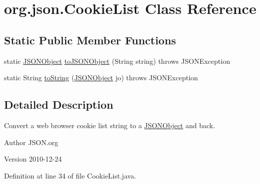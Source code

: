 \hypertarget{classorg_1_1json_1_1_cookie_list}{\section{org.\-json.\-Cookie\-List Class Reference}
\label{classorg_1_1json_1_1_cookie_list}
}
\subsection*{Static Public Member Functions}
\begin{DoxyCompactItemize}
\item 
static \hyperlink{classorg_1_1json_1_1_j_s_o_n_object}{J\-S\-O\-N\-Object} \hyperlink{classorg_1_1json_1_1_cookie_list_a3f79cd0dadd831ff9bdfb6afd41cd081}{to\-J\-S\-O\-N\-Object} (String string)  throws J\-S\-O\-N\-Exception 
\item 
static String \hyperlink{classorg_1_1json_1_1_cookie_list_a40f938404f28eda8b66bc17dfcd2261f}{to\-String} (\hyperlink{classorg_1_1json_1_1_j_s_o_n_object}{J\-S\-O\-N\-Object} jo)  throws J\-S\-O\-N\-Exception 
\end{DoxyCompactItemize}


\subsection{Detailed Description}
Convert a web browser cookie list string to a \hyperlink{classorg_1_1json_1_1_j_s_o_n_object}{J\-S\-O\-N\-Object} and back. \begin{DoxyAuthor}{Author}
J\-S\-O\-N.\-org 
\end{DoxyAuthor}
\begin{DoxyVersion}{Version}
2010-\/12-\/24 
\end{DoxyVersion}


Definition at line 34 of file Cookie\-List.\-java.




